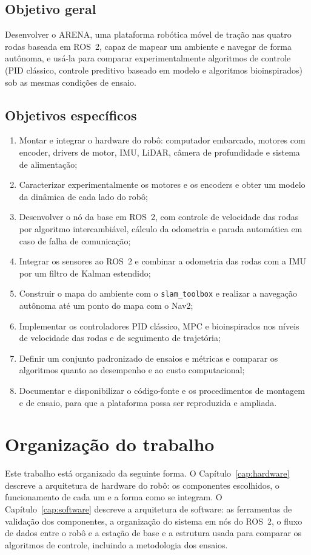 \subsection{Objetivo geral}

Desenvolver o ARENA, uma plataforma robótica móvel de tração nas quatro
rodas baseada em ROS~2, capaz de mapear um ambiente e navegar de forma
autônoma, e usá-la para comparar experimentalmente algoritmos de controle
(PID clássico, controle preditivo baseado em modelo e algoritmos
bioinspirados) sob as mesmas condições de ensaio.

\subsection{Objetivos específicos}

\begin{enumerate}
	\item Montar e integrar o hardware do robô: computador embarcado,
	motores com encoder, drivers de motor, IMU, LiDAR, câmera de
	profundidade e sistema de alimentação;
	\item Caracterizar experimentalmente os motores e os encoders e obter
	um modelo da dinâmica de cada lado do robô;
	\item Desenvolver o nó da base em ROS~2, com controle de velocidade das
	rodas por algoritmo intercambiável, cálculo da odometria e parada
	automática em caso de falha de comunicação;
	\item Integrar os sensores ao ROS~2 e combinar a odometria das rodas com
	a IMU por um filtro de Kalman estendido;
	\item Construir o mapa do ambiente com o \texttt{slam\_toolbox} e
	realizar a navegação autônoma até um ponto do mapa com o Nav2;
	\item Implementar os controladores PID clássico, MPC e bioinspirados
	nos níveis de velocidade das rodas e de seguimento de trajetória;
	\item Definir um conjunto padronizado de ensaios e métricas e comparar
	os algoritmos quanto ao desempenho e ao custo computacional;
	\item Documentar e disponibilizar o código-fonte e os procedimentos de
	montagem e de ensaio, para que a plataforma possa ser reproduzida e
	ampliada.
\end{enumerate}

\section{Organização do trabalho}

Este trabalho está organizado da seguinte forma. O
Capítulo~\ref{cap:hardware} descreve a arquitetura de hardware do robô:
os componentes escolhidos, o funcionamento de cada um e a forma como se
integram. O Capítulo~\ref{cap:software} descreve a arquitetura de
software: as ferramentas de validação dos componentes, a organização do
sistema em nós do ROS~2, o fluxo de dados entre o robô e a estação de
base e a estrutura usada para comparar os algoritmos de controle,
incluindo a metodologia dos ensaios.

